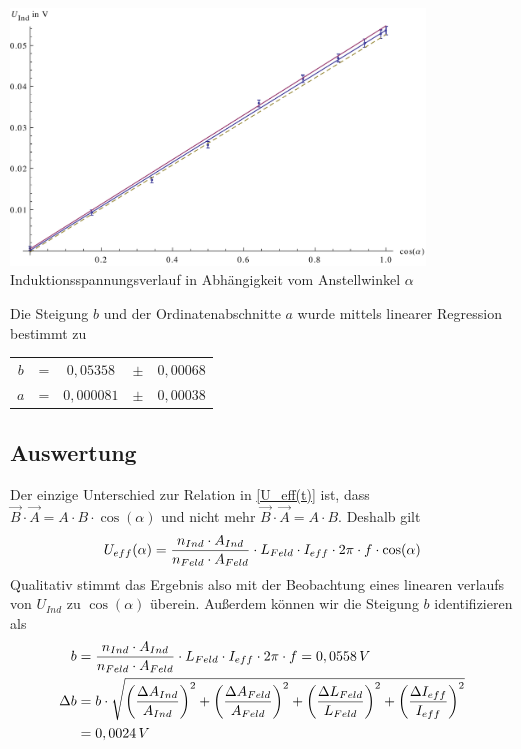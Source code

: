 \documentclass{article}
\begin{document}
\begin{center}
  \includegraphics[width=11cm]{graph4}
	Induktionsspannungsverlauf in Abhängigkeit vom Anstellwinkel \( \alpha \)
\end{center}
Die Steigung \(b\) und der Ordinatenabschnitte \(a\) wurde mittels linearer Regression bestimmt zu

\begin{center}
\begin{tabular}{c c c c c} 
  \(b\) & = & \(0,05358\) & \(\pm \) & \(0,00068 \) \\ 
  \(a\) & = & \(0,000081\) & \(\pm \) & \(0,00038 \) \\ 

 \end{tabular}
\end{center}

\subsection{Auswertung}
Der einzige Unterschied zur Relation in \eqref{U_eff(t)} ist, dass \(\vec{B} \cdot \vec{A} = A \cdot B \cdot \cos(\alpha) \) und nicht mehr \(\vec{B} \cdot \vec{A} = A \cdot B \). Deshalb gilt
\begin{equation}
U_{eff}(\alpha) = \frac{n_{Ind} \cdot A_{Ind}}{n_{Feld} \cdot A_{Feld}} \cdot L_{Feld} \cdot I_{eff} \cdot 2\pi \cdot f \cdot \cos(\alpha)
\notag
\end{equation}
Qualitativ stimmt das Ergebnis also mit der Beobachtung eines linearen verlaufs von \( U_{Ind} \) zu \( \cos(\alpha) \) überein. Außerdem können wir die Steigung \(b\) identifizieren als
\begin{align}
b &= \frac{n_{Ind} \cdot A_{Ind}}{n_{Feld} \cdot A_{Feld}} \cdot L_{Feld} \cdot I_{eff} \cdot 2\pi \cdot f
= 0,0558 \,V
\notag
\\
\Delta b &= b \cdot \sqrt{
\left( \frac{\Delta A_{Ind}}{A_{Ind}} \right)^2 +
\left( \frac{\Delta A_{Feld}}{A_{Feld}} \right)^2 +
\left( \frac{\Delta L_{Feld}}{L_{Feld}} \right)^2 +
\left( \frac{\Delta I_{eff}}{I_{eff}} \right)^2
}
\notag
\\
&= 0,0024 \, V
\notag
\end{align}
\end{document}
